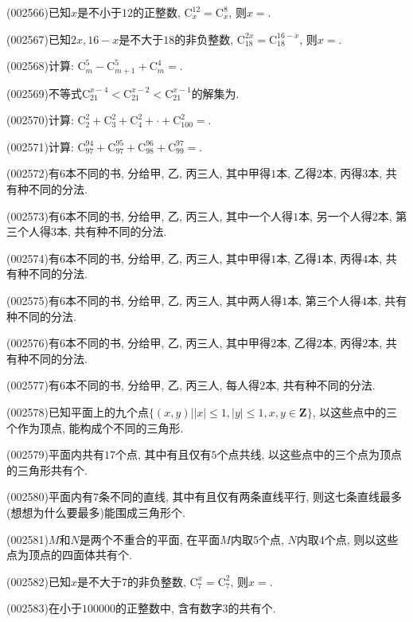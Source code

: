 \item (002566)已知$x$是不小于$12$的正整数, $\mathrm{C}_x^{12}=\mathrm{C}_x^8$, 则$x=$.
\item (002567)已知$2x,16-x$是不大于$18$的非负整数, $\mathrm{C}_{18}^{2x}=\mathrm{C}_{18}^{16-x}$, 则$x=$.
\item (002568)计算: $\mathrm{C}_m^5-\mathrm{C}_{m+1}^5+\mathrm{C}_m^4=$.
\item (002569)不等式$\mathrm{C}_{21}^{x-4}<\mathrm{C}_{21}^{x-2}<\mathrm{C}_{21}^{x-1}$的解集为.
\item (002570)计算: $\mathrm{C}_2^2+\mathrm{C}_3^2+\mathrm{C}_4^2+\cdot+\mathrm{C}_{100}^2=$.
\item (002571)计算: $\mathrm{C}_{97}^{94}+\mathrm{C}_{97}^{95}+\mathrm{C}_{98}^{96}+\mathrm{C}_{99}^{97}=$.
\item (002572)有$6$本不同的书, 分给甲, 乙, 丙三人, 其中甲得$1$本, 乙得$2$本, 丙得$3$本, 共有种不同的分法.
\item (002573)有$6$本不同的书, 分给甲, 乙, 丙三人, 其中一个人得$1$本, 另一个人得$2$本, 第三个人得$3$本, 共有种不同的分法.
\item (002574)有$6$本不同的书, 分给甲, 乙, 丙三人, 其中甲得$1$本, 乙得$1$本, 丙得$4$本, 共有种不同的分法.
\item (002575)有$6$本不同的书, 分给甲, 乙, 丙三人, 其中两人得$1$本, 第三个人得$4$本, 共有种不同的分法.
\item (002576)有$6$本不同的书, 分给甲, 乙, 丙三人, 其中甲得$2$本, 乙得$2$本, 丙得$2$本, 共有种不同的分法.
\item (002577)有$6$本不同的书, 分给甲, 乙, 丙三人, 每人得$2$本, 共有种不同的分法.
\item (002578)已知平面上的九个点$\{(x,y)||x|\le1, |y|\le 1,  x,y\in\mathbf{Z}\}$, 以这些点中的三个作为顶点, 能构成个不同的三角形.
\item (002579)平面内共有$17$个点, 其中有且仅有$5$个点共线, 以这些点中的三个点为顶点的三角形共有个.
\item (002580)平面内有$7$条不同的直线, 其中有且仅有两条直线平行, 则这七条直线最多(想想为什么要最多)能围成三角形个.
\item (002581)$M$和$N$是两个不重合的平面, 在平面$M$内取$5$个点, $N$内取$4$个点, 则以这些点为顶点的四面体共有个.
\item (002582)已知$x$是不大于$7$的非负整数, $\mathrm{C}_7^x=\mathrm{C}_7^2$, 则$x=$.
\item (002583)在小于$100000$的正整数中, 含有数字$3$的共有个.
